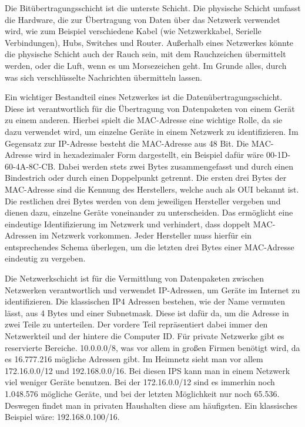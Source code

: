 \begin{compactenum} 
    \item Die Bitübertragungsschicht ist die unterste Schicht. Die physische Schicht umfasst die Hardware, die zur Übertragung von Daten über das Netzwerk verwendet wird, wie zum Beispiel verschiedene Kabel (wie Netzwerkkabel, Serielle Verbindungen), Hubs, Switches und Router. Außerhalb eines Netzwerkes könnte die physische Schicht auch der Rauch sein, mit dem Rauchzeichen übermittelt werden, oder die Luft, wenn es um Morsezeichen geht. Im Grunde alles, durch was sich verschlüsselte Nachrichten übermitteln lassen.  
    \item Ein wichtiger Bestandteil eines Netzwerkes ist die Datenübertragungsschicht. Diese ist verantwortlich für die Übertragung von Datenpaketen von einem Gerät zu einem anderen. Hierbei spielt die MAC-Adresse eine wichtige Rolle, da sie dazu verwendet wird, um einzelne Geräte in einem Netzwerk zu identifizieren. Im Gegensatz zur IP-Adresse besteht die MAC-Adresse aus 48 Bit. Die MAC-Adresse wird in hexadezimaler Form dargestellt, ein Beispiel dafür wäre 00-1D-60-4A-8C-CB. Dabei werden stets zwei Bytes zusammengefasst und durch einen Bindestrich oder durch einen Doppelpunkt getrennt. Die ersten drei Bytes der MAC-Adresse sind die Kennung des Herstellers, welche auch als \glqq OUI\grqq{} bekannt ist. Die restlichen drei Bytes werden von dem jeweiligen Hersteller vergeben und dienen dazu, einzelne Geräte voneinander zu unterscheiden. Das ermöglicht eine eindeutige Identifizierung im Netzwerk und verhindert, dass doppelt MAC-Adressen im Netzwerk vorkommen. Jeder Hersteller muss hierfür ein entsprechendes Schema überlegen, um die letzten drei Bytes einer MAC-Adresse eindeutig zu vergeben.     \cite{wieisteineMacaufgebaut} 
    \item Die Netzwerkschicht ist für die Vermittlung von Datenpaketen zwischen Netzwerken verantwortlich und verwendet IP-Adressen, um Geräte im Internet zu identifizieren. \cite{ipAddress} Die klassischen IP4 Adressen bestehen, wie der Name vermuten lässt, aus 4 Bytes und einer Subnetmask. Diese ist dafür da, um die Adresse in zwei Teile zu unterteilen. Der vordere Teil repräsentiert dabei immer den Netzwerkteil und der hintere die Computer ID. Für private Netzwerke gibt es reservierte Bereiche. 10.0.0.0/8, was vor allem in großen Firmen benötigt wird, da es 16.777.216 mögliche Adressen gibt. Im Heimnetz sieht man vor allem 172.16.0.0/12 und 192.168.0.0/16. Bei diesen IPS kann man in einem Netzwerk viel weniger Geräte benutzen. Bei der 172.16.0.0/12 sind es immerhin noch 1.048.576 mögliche Geräte, und bei der letzten Möglichkeit nur noch 65.536. Deswegen findet man in privaten Haushalten diese am häufigsten. Ein klassisches Beispiel wäre: 192.168.0.100/16.   

\end{compactenum}
